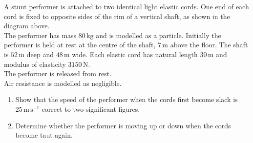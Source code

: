 \documentclass[leqno]{article}
\begin{document}
\begin{enumerate}[
  label=\textbf{\arabic*.},
  leftmargin=*,
  topsep=0pt,
  partopsep=0pt,
  parsep=0pt
]
\begin{figure}[H]
\end{figure}


A stunt performer is attached to two identical light elastic cords. One end of each cord is fixed to opposite sides of the rim of a vertical shaft, as shown in the diagram above. \\

The performer has mass $80\,\mathrm{kg}$ and is modelled as a particle. Initially the performer is held at rest at the centre of the shaft, $7\,\mathrm{m}$ above the floor. The shaft is $52\,\mathrm{m}$ deep and $48\,\mathrm{m}$ wide. Each elastic cord has natural length $30\,\mathrm{m}$ and modulus of elasticity $3150\,\mathrm{N}$. \\

The performer is released from rest. \\

Air resistance is modelled as negligible. \\

\begin{enumerate}[label=\textbf{(\alph*)}]
  \item Show that the speed of the performer when the cords first become slack is $25\,\mathrm{m\,s^{-1}}$ correct to two significant figures.  \\
  \item Determine whether the performer is moving up or down when the cords become taut again.  \\
\end{enumerate}

\end{enumerate}
\end{document}
